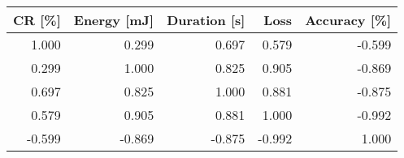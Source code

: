 \begin{tabular}{rrrrr}
\toprule
    CR [\%] & Energy [mJ] & Duration [s] &       Loss & Accuracy [\%] \\
\midrule
     1.000 &       0.299 &        0.697 &      0.579 &       -0.599 \\
     0.299 &       1.000 &        0.825 &      0.905 &       -0.869 \\
     0.697 &       0.825 &        1.000 &      0.881 &       -0.875 \\
     0.579 &       0.905 &        0.881 &      1.000 &       -0.992 \\
    -0.599 &      -0.869 &       -0.875 &     -0.992 &        1.000 \\
\bottomrule
\end{tabular}
